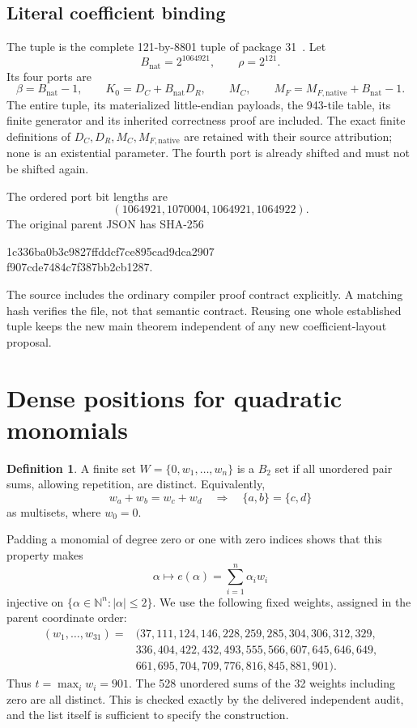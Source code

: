 \documentclass[11pt,letterpaper]{article}
\theoremstyle{definition}\newtheorem{definition}[theorem]{Definition}
\theoremstyle{remark}\newtheorem{remark}[theorem]{Remark}
\newcommand{\N}{\mathbb N}
\begin{document}
\subsection{Literal coefficient binding}

The tuple is the complete 121-by-8801 tuple of package 31~\cite{pkg31}. Let
\[
 B_{\mathrm{nat}}=2^{1064921},\qquad\rho=2^{121}.
\]
Its four ports are
\[
 \beta=B_{\mathrm{nat}}-1,\qquad K_0=D_C+B_{\mathrm{nat}}D_R,\qquad
 M_C,\qquad M_F=M_{F,\mathrm{native}}+B_{\mathrm{nat}}-1.
\]
The entire tuple, its materialized little-endian payloads, the 943-tile table, its finite generator and its inherited correctness proof are included. The exact finite definitions of $D_C,D_R,M_C,M_{F,\mathrm{native}}$ are retained with their source attribution; none is an existential parameter. The fourth port is already shifted and must not be shifted again.

The ordered port bit lengths are
\[
 (1064921,1070004,1064921,1064922).
\]
The original parent JSON has SHA-256
\begin{center}\footnotesize\ttfamily
1c336ba0b3c9827ffddcf7ce895cad9dca2907\\
f907cde7484c7f387bb2cb1287.
\end{center}
The source includes the ordinary compiler proof contract explicitly. A matching hash verifies the file, not that semantic contract. Reusing one whole established tuple keeps the new main theorem independent of any new coefficient-layout proposal.

\section{Dense positions for quadratic monomials}\label{sec:sidon}

\begin{definition}
A finite set $W=\{0,w_1,\ldots,w_n\}$ is a $B_2$ set if all unordered pair sums, allowing repetition, are distinct. Equivalently,
\[
 w_a+w_b=w_c+w_d\quad\Longrightarrow\quad\{a,b\}=\{c,d\}
\]
as multisets, where $w_0=0$.
\end{definition}

Padding a monomial of degree zero or one with zero indices shows that this property makes
\[
 \alpha\longmapsto e(\alpha)=\sum_{i=1}^{n}\alpha_iw_i
\]
injective on $\{\alpha\in\N^n:|\alpha|\le2\}$. We use the following fixed weights, assigned in the parent coordinate order:
\begin{align*}
 (w_1,\ldots,w_{31})={}&(37,111,124,146,228,259,285,304,306,312,329,\\
 &336,404,422,432,493,555,566,607,645,646,649,\\
 &661,695,704,709,776,816,845,881,901).
\end{align*}
Thus $t=\max_iw_i=901$. The 528 unordered sums of the 32 weights including zero are all distinct. This is checked exactly by the delivered independent audit, and the list itself is sufficient to specify the construction.
\end{document}
